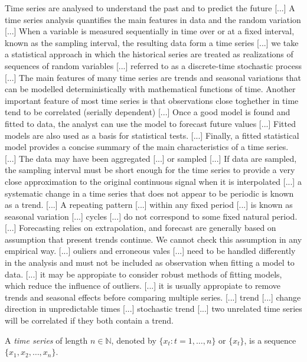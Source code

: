 {\color{red} Time series are analysed to understand the past and to predict the future [...] A time series analysis quantifies the main features in data and the random variation [...] When a variable is measured sequentially in time over or at a fixed interval, known as the sampling interval, the resulting data form a time series [...] we take a statistical approach in which the historical series are treated as realizations of sequences of random variables [...] referred to as a discrete-time stochastic process [...] The main features of many time series are trends and seasonal variations that can be modelled deterministically with mathematical functions of time. Another important feature of most time series is that observations close toghether in time tend to be correlated (serially dependent) [...] Once a good model is found and fitted to data, the analyst can use the model to forecast future values [...] Fitted models are also used as a basis for statistical tests. [...] Finally, a fitted statistical model provides a concise summary of the main characteristics of a time series. [...] The data may have been aggregated [...] or sampled [...] If data are sampled, the sampling interval must be short enough for the time series to provide a very close approximation to the original continuous signal when it is interpolated [...] a systematic change in a time series that does not appear to be periodic is known as a trend. [...] A repeating pattern [...] within any fixed period [...] is known as seasonal variation [...] cycles [...] do not correspond to some fixed natural period. [...] Forecasting relies on extrapolation, and forecast are generally based on assumption that present trends continue. We cannot check this assumption in any empirical way. [...] ouliers and erroneous vales [...] need to be handled differently in the analysis and must not be included as observation when fitting a model to data. [...] it may be appropiate to consider robust methods of fitting models, which reduce the influence of outliers. [...] it is usually appropiate to remove trends and seasonal effects before comparing multiple series. [...] trend [...] change direction in unpredictable times [...] stochastic trend [...] two unrelated time series will be correlated if they both contain a trend.}

\begin{definition}
    A \emph{time series} of length $n \in \mathbb{N}$, denoted by $\{ x_t : t=1, \ldots, n \}$ or $\{ x_t \}$, is a sequence $\{ x_1, x_2, \ldots, x_n \}$.
\end{definition}

